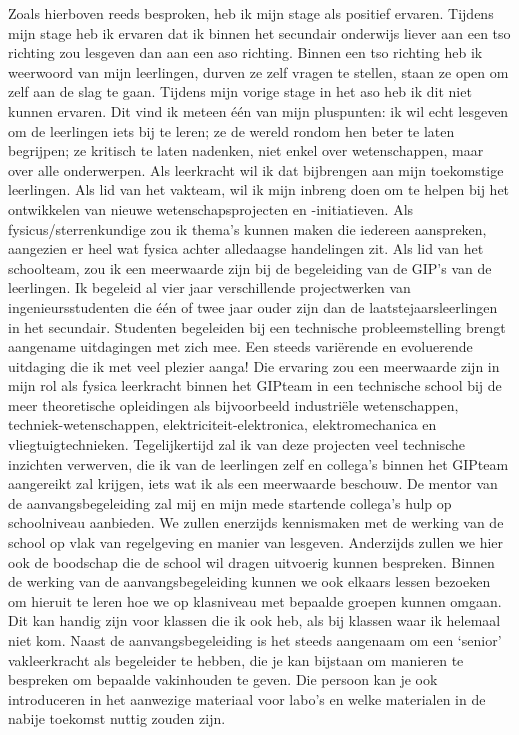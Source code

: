 \documentclass[a4paper,12pt,twoside]{article}%
\begin{document}
Zoals hierboven reeds besproken, heb ik mijn stage als positief ervaren. Tijdens mijn stage heb ik ervaren dat ik binnen het secundair onderwijs liever aan een tso richting zou lesgeven dan aan een aso richting. Binnen een tso richting heb ik weerwoord van mijn leerlingen, durven ze zelf vragen te stellen, staan ze open om zelf aan de slag te gaan. Tijdens mijn vorige stage in het aso heb ik dit niet kunnen ervaren.\newline\newline
Dit vind ik meteen één van mijn pluspunten: ik wil echt lesgeven om de leerlingen iets bij te leren; ze de wereld rondom hen beter te laten begrijpen; ze kritisch te laten nadenken, niet enkel over wetenschappen, maar over alle onderwerpen. Als leerkracht wil ik dat bijbrengen aan mijn toekomstige leerlingen. \newline
Als lid van het vakteam, wil ik mijn inbreng doen om te helpen bij het ontwikkelen van nieuwe wetenschapsprojecten en -initiatieven. Als fysicus/sterrenkundige zou ik thema's kunnen maken die iedereen aanspreken, aangezien er heel wat fysica achter alledaagse handelingen zit. Als lid van het schoolteam, zou ik een meerwaarde zijn bij de begeleiding van de GIP's van de leerlingen. Ik begeleid al vier jaar verschillende projectwerken van ingenieursstudenten die één of twee jaar ouder zijn dan de laatstejaarsleerlingen in het secundair. Studenten begeleiden bij een technische probleemstelling brengt aangename uitdagingen met zich mee. Een steeds variërende en evoluerende uitdaging die ik met veel plezier aanga! Die ervaring zou een meerwaarde zijn in mijn rol als fysica leerkracht binnen het GIPteam in een technische school bij de meer theoretische opleidingen als bijvoorbeeld industriële wetenschappen, techniek-wetenschappen, elektriciteit-elektronica, elektromechanica en vliegtuigtechnieken. Tegelijkertijd zal ik van deze projecten veel technische inzichten verwerven, die ik van de leerlingen zelf en collega's binnen het GIPteam aangereikt zal krijgen, iets wat ik als een meerwaarde beschouw.\newline\newline
De mentor van de aanvangsbegeleiding zal mij en mijn mede startende collega's hulp op schoolniveau aanbieden. We zullen enerzijds kennismaken met de werking van de school op vlak van regelgeving en manier van lesgeven. Anderzijds zullen we hier ook de boodschap die de school wil dragen uitvoerig kunnen bespreken. Binnen de werking van de  aanvangsbegeleiding kunnen we ook elkaars lessen bezoeken om hieruit te leren hoe we op klasniveau met bepaalde groepen kunnen omgaan. Dit kan handig zijn voor klassen die ik ook heb, als bij klassen waar ik helemaal niet kom. Naast de aanvangsbegeleiding is het steeds aangenaam om een `senior' vakleerkracht als begeleider te hebben, die je kan bijstaan om manieren te bespreken om bepaalde vakinhouden te geven. Die persoon kan je ook introduceren in het aanwezige materiaal voor labo's en welke materialen in de nabije toekomst nuttig zouden zijn.\newline\newline
\end{document}
